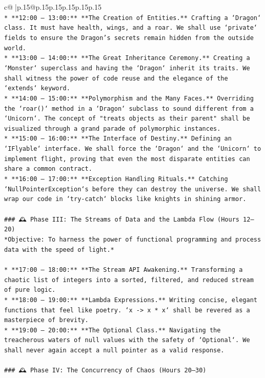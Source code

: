 \documentclass{article}
\begin{document}
{\begin{supertabular}{c@{$\;$}|p{.15\linewidth}@{}p{.15\linewidth}p{.15\linewidth}p{.15\linewidth}p{.15\linewidth}p{.15\linewidth}}
{{{\\ 
\texttt{*   **12:00 – 13:00:** **The Creation of Entities.** Crafting a `Dragon` class. It must have health, wings, and a roar. We shall use `private` fields to ensure the Dragon's secrets remain hidden from the outside world.} \\
\texttt{*   **13:00 – 14:00:** **The Great Inheritance Ceremony.** Creating a `Monster` superclass and having the `Dragon` inherit its traits. We shall witness the power of code reuse and the elegance of the `extends` keyword.} \\
\texttt{*   **14:00 – 15:00:** **Polymorphism and the Many Faces.** Overriding the `roar()` method in a `Dragon` subclass to sound different from a `Unicorn`. The concept of "treats objects as their parent" shall be visualized through a grand parade of polymorphic instances.} \\
\texttt{*   **15:00 – 16:00:** **The Interface of Destiny.** Defining an `IFlyable` interface. We shall force the `Dragon` and the `Unicorn` to implement flight, proving that even the most disparate entities can share a common contract.} \\
\texttt{*   **16:00 – 17:00:** **Exception Handling Rituals.** Catching `NullPointerException`s before they can destroy the universe. We shall wrap our code in `try{-}catch` blocks like knights in shining armor.} \\
\\ 
\texttt{\#\#\# 🕰️ Phase III: The Streams of Data and the Lambda Flow (Hours 12–20)} \\
\texttt{*Objective: To harness the power of functional programming and process data with the speed of light.*} \\
\\ 
\texttt{*   **17:00 – 18:00:** **The Stream API Awakening.** Transforming a chaotic list of integers into a sorted, filtered, and reduced stream of pure logic.} \\
\texttt{*   **18:00 – 19:00:** **Lambda Expressions.** Writing concise, elegant functions that feel like poetry. `x {-}> x * x` shall be revered as a masterpiece of brevity.} \\
\texttt{*   **19:00 – 20:00:** **The Optional Class.** Navigating the treacherous waters of null values with the safety of `Optional`. We shall never again accept a null pointer as a valid response.} \\
\\ 
\texttt{\#\#\# 🕰️ Phase IV: The Concurrency of Chaos (Hours 20–30)} \\
}}}
\end{supertabular}}
\end{document}
